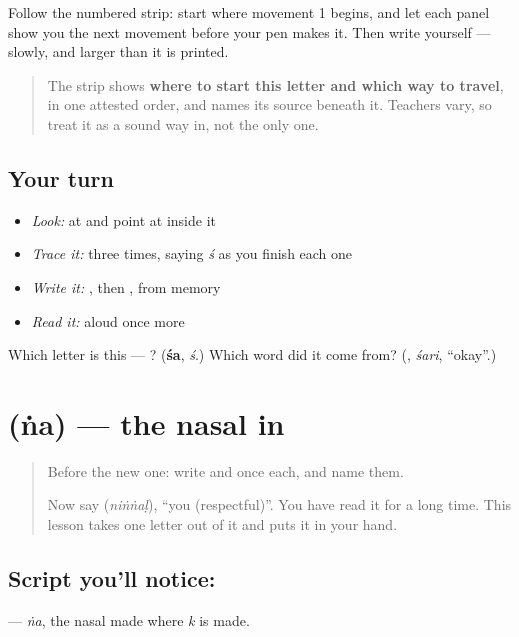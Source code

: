 Follow the numbered strip: start where movement 1 begins, and let each panel show you the next movement before your pen makes it. Then write  yourself — slowly, and larger than it is printed.

\begin{quote}
The strip shows \textbf{where to start this letter and which way to travel}, in one attested order, and names its source beneath it. Teachers vary, so treat it as a sound way in, not the only one.
\end{quote}

\subsection*{Your turn}
\begin{itemize}
\raggedright
  \item \emph{Look:} at \textbf{} and point at  inside it
  \item \emph{Trace it:}  three times, saying \emph{ś} as you finish each one
  \item \emph{Write it:} , then , from memory
  \item \emph{Read it:} \textbf{} aloud once more
\end{itemize}

\begin{tcolorbox}[breakable,colback=teal!4,colframe=teal!35!black,title={Before you move on}]
Which letter is this — ? (\textbf{śa}, \emph{ś}.) Which word did it come from? (\textbf{}, \emph{śari}, \textquotedblleft{}okay\textquotedblright{}.)
\end{tcolorbox}
\section[\texorpdfstring{\ml{ങ} (ṅa)}{ങ (ṅa)}]{ (ṅa) — the nasal in }

\label{lesson:ML-W113-nga}



\begin{quote}
Before the new one: write  and  once each, and name them.

Now say \textbf{} (\emph{niṅṅaḷ}), \textquotedblleft{}you (respectful)\textquotedblright{}. You have read it for a long time. This lesson takes one letter out of it and puts it in your hand.
\end{quote}

\subsection*{Script you'll notice: }
\textbf{} — \emph{ṅa}, the nasal made where \emph{k} is made.


